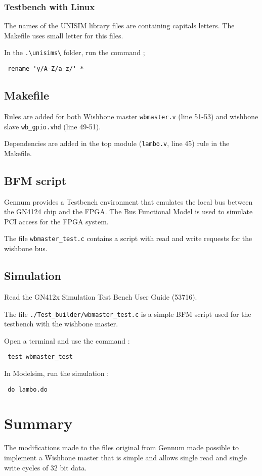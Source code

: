 \documentclass[10pt,a4paper]{cerndoc}
\begin{document}
	\subsubsection{Testbench with Linux}
The names of the UNISIM library files are containing capitals letters. The Makefile uses small letter for this files.

In the \verb+.\unisims\+ folder, run the command ;
\begin{lstlisting}
 rename 'y/A-Z/a-z/' *
\end{lstlisting}


  \subsection{Makefile}
Rules are added for both Wishbone master \verb+wbmaster.v+ (line 51-53) and wishbone slave \verb+wb_gpio.vhd+ (line 49-51).

Dependencies are added in the top module (\verb+lambo.v+, line 45) rule in the Makefile.
	
	
  \subsection{BFM script}
Gennum provides a Testbench environment that emulates the local bus between the GN4124 chip and the FPGA. The Bus Functional Model is used to simulate PCI access for the FPGA system.
	
The file \verb+wbmaster_test.c+ contains a script with read and write requests for the wishbone bus.
  
  
  \subsection{Simulation}
Read the GN412x Simulation Test Bench User Guide (53716).

The file \verb+./Test_builder/wbmaster_test.c+ is a simple BFM script used for the testbench with the wishbone master.
 
Open a terminal and use the command :
\begin{lstlisting}
 test wbmaster_test
\end{lstlisting}

In Modelsim, run the simulation :
\begin{lstlisting}
 do lambo.do
\end{lstlisting}



  
    


\section*{Summary}
The modifications made to the files original from Gennum made possible to implement a Wishbone master that is simple and allows single read and single write cycles of 32 bit data.
\end{document}
